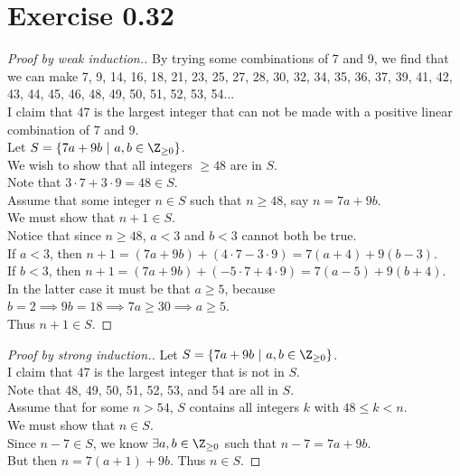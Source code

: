 \documentclass{article}
\begin{document}
\section*{Exercise 0.32}
\begin{proof}[Proof by weak induction.]
    By trying some combinations of 7 and 9, we find that we can make 7, 9, 14, 16, 18, 21, 23, 25, 27, 28, 30, 32, 34, 35, 36, 37, 39, 41, 42, 43, 44, 45, 46, 48, 49, 50, 51, 52, 53, 54...\\
    I claim that 47 is the largest integer that can not be made with a positive linear combination of 7 and 9. \\
    Let \(S=\left\{7a+9b\ |\ a,b\in\Z_{\geq 0}\right\}\). \\
    We wish to show that all integers \(\geq 48\) are in \(S\). \\
    Note that \(3\cdot 7+3\cdot 9=48\in S\). \\
    Assume that some integer \(n\in S\) such that \(n\geq 48\), say \(n=7a+9b\). \\
    We must show that \(n+1\in S\). \\
    Notice that since \(n\geq 48\), \(a<3\) and \(b<3\) cannot both be true. \\
    If \(a < 3\), then \(n+1 = (7a+9b)+(4\cdot 7-3\cdot 9) = 7(a+4)+9(b-3)\). \\
    If \(b < 3\), then \(n+1 = (7a+9b)+(-5\cdot 7+4\cdot 9) = 7(a-5)+9(b+4)\). \\
    In the latter case it must be that \(a\geq 5\), because \(b=2 \implies 9b=18 \implies 7a\geq 30\implies a\geq 5\). \\
    Thus \(n+1\in S\).
\end{proof}

\begin{proof}[Proof by strong induction.]
    Let \(S=\left\{7a+9b\ |\ a,b\in\Z_{\geq 0}\right\}\). \\
    I claim that 47 is the largest integer that is not in \(S\). \\
    Note that 48, 49, 50, 51, 52, 53, and 54 are all in \(S\). \\
    Assume that for some \(n>54\), \(S\) contains all integers \(k\) with \(48\leq k < n\). \\
    We must show that \(n\in S\). \\
    Since \(n-7\in S\), we know \(\exists a,b \in \Z_{\geq 0}\) such that \(n-7 = 7a+9b\). \\
    But then \(n=7(a+1)+9b\). Thus \(n\in S\).
\end{proof}
\end{document}
